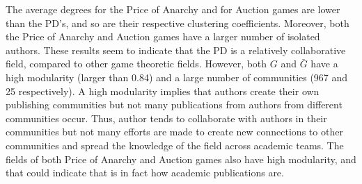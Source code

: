 \documentclass{article}
\theoremstyle{definition}
\begin{document}
The average degrees for the Price of Anarchy and for Auction games are lower
than the PD's, and so are their respective clustering coefficients. Moreover,
both the Price of Anarchy and Auction games have a larger number of isolated
authors. These results seem to indicate that the PD is a relatively collaborative
field, compared to other game theoretic fields.
However, both \(G\) and \(\bar{G}\) have a high modularity (larger than 0.84) and a large number of
communities (967 and 25 respectively). A high modularity implies that authors create their own publishing
communities but not many publications from authors from different communities
occur. Thus, author tends to collaborate with authors in their communities but
not many efforts are made to create new connections to other communities and
spread the knowledge of the field across academic teams. The fields
of both Price of Anarchy and Auction games also have high modularity, and
that could indicate that is in fact how academic publications are.

\begin{table}[!hbtp]
    \centering
    \caption{Network metrics for \(G\), \(\bar{G}\), Auction games and Price of
    Anarchy.}
    \label{table:network_comparison}
\end{table}
\end{document}
